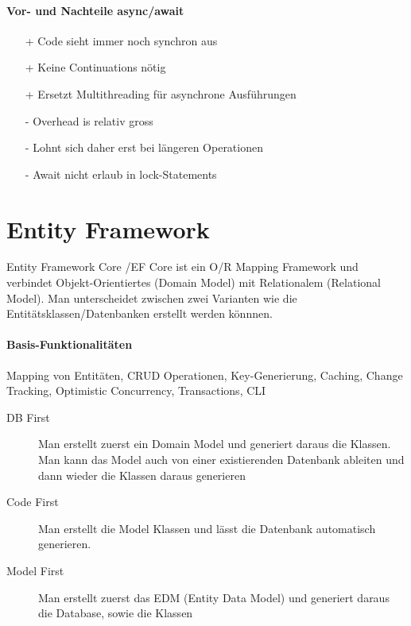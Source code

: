 \documentclass[
a4paper,
oneside,
10pt,
fleqn,
headsepline,
toc=listofnumbered, 
bibliography=totocnumbered]{scrartcl}
\let\stdsection\section
\renewcommand\section{\clearpage\stdsection}
\begin{document}
\paragraph{Vor- und Nachteile async/await}
\begin{itemize}
    \item[+] Code sieht immer noch synchron aus 
    \item[+] Keine Continuations nötig
    \item[+] Ersetzt Multithreading für asynchrone Ausführungen 
    \item[-] Overhead is relativ gross
    \item[-] Lohnt sich daher erst bei längeren Operationen
    \item[-] Await nicht erlaub in lock-Statements
\end{itemize}

\section{Entity Framework}
Entity Framework Core /EF Core ist ein O/R Mapping Framework und verbindet Objekt-Orientiertes (Domain Model) mit Relationalem (Relational Model). Man unterscheidet zwischen zwei Varianten wie die Entitätsklassen/Datenbanken erstellt werden könnnen. 
\paragraph{Basis-Funktionalitäten} Mapping von Entitäten, CRUD Operationen, Key-Generierung, Caching, Change Tracking, Optimistic Concurrency, Transactions, CLI
\begin{description}
	\item[DB First] Man erstellt zuerst ein Domain Model und generiert daraus die Klassen. Man kann das Model auch von einer existierenden Datenbank ableiten und dann wieder die Klassen daraus generieren
	\item[Code First] Man erstellt die Model Klassen und lässt die Datenbank automatisch generieren.
	\item[Model First] Man erstellt zuerst das EDM (Entity Data Model) und generiert daraus die Database, sowie die Klassen
\end{description}
\end{document}
